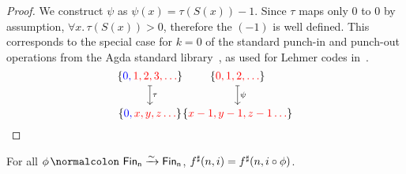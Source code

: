 \begin{proof}
    We construct $\psi$ as $\psi(x) = \tau(S(x)) - 1$.
    Since $\tau$ maps only 0 to 0 by assumption, $\forall x. \, \tau(S(x)) > 0$, therefore
    the $(- 1)$ is well defined. This corresponds to the special case for $k = 0$ of the standard
    punch-in and punch-out operations from the Agda standard library~\cite{Daggitt_The_Agda_standard_2025}, as used for Lehmer codes
    in~\cite{choudhurySymmetriesReversibleProgramming2022}.
    \[
        \begin{tikzcd}[ampersand replacement=\&,cramped]
            {\{\color{blue}0, \color{red}1, 2, 3, \dots \color{black}\}} \\
            { \{\color{blue}0, \color{red} x, y, z \dots \color{black}\}}
            \arrow["\tau", maps to, from=1-1, to=2-1]
        \end{tikzcd}
        \\
        \begin{tikzcd}[ampersand replacement=\&,cramped]
            {\{\color{red}0, 1, 2, \dots \color{black}\}} \\
            { \{\color{red} x-1, y-1, z-1 \dots \color{black}\}}
            \arrow["\psi", maps to, from=1-1, to=2-1]
        \end{tikzcd}
    \]
\end{proof}

\begin{theorem}
    \label{bag:perm-sat}
    For all $\phi\colon \Fin[n]\xto{\sim}\Fin[n]$, $\ext{f}(n, i) \id \ext{f}(n, i \circ \phi)$.
\end{theorem}

